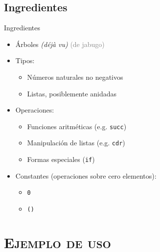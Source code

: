 \documentclass[xcolor=x11names,compress]{beamer}
\renewcommand{\(}{\begin{columns}}
\renewcommand{\)}{\end{columns}}
\newcommand{\<}[1]{\begin{column}{#1}}
\renewcommand{\>}{\end{column}}
\begin{document}
\subsection{Ingredientes}
\begin{frame}{Ingredientes}
    \begin{itemize}
        \item Árboles \pause \emph{(déjà vu)} \pause \textcolor{gray}{\scriptsize(de jabugo)} \pause
        \item Tipos: \pause
            \begin{itemize}
            \item Números naturales no negativos \pause
            \item Listas, posiblemente anidadas \pause
            \end{itemize}
        \item Operaciones: \pause
            \begin{itemize}
                \item Funciones aritméticas (e.g. \texttt{succ}) \pause
                \item Manipulación de listas (e.g. \texttt{cdr}) \pause
                \item Formas especiales (\texttt{if}) \pause
            \end{itemize}
        \item Constantes (operaciones sobre cero elementos): \pause
            \begin{itemize}
                \item \texttt{0} \pause
                \item \texttt{()}
            \end{itemize}
    \end{itemize}
\end{frame}

\section{\scshape Ejemplo de uso}
\end{document}
